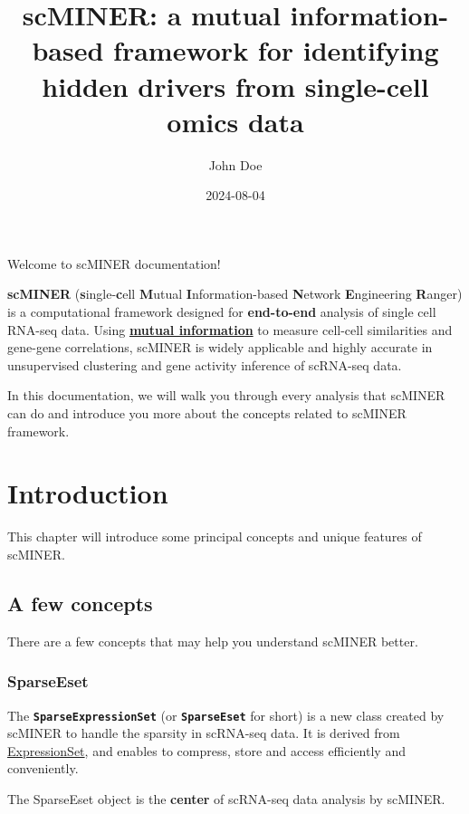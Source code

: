 \documentclass[
  12pt,
]{book}
\title{scMINER: a mutual information-based framework for identifying hidden drivers from single-cell omics data}
\author{John Doe}
\date{2024-08-04}
\begin{document}
\maketitle

{
\hypersetup{linkcolor=}
\setcounter{tocdepth}{1}
\tableofcontents
}
\listoffigures
\listoftables
Welcome to scMINER documentation!

\textbf{scMINER} (\textbf{s}ingle-\textbf{c}ell \textbf{M}utual \textbf{I}nformation-based \textbf{N}etwork \textbf{E}ngineering \textbf{R}anger) is a computational framework designed for \textbf{end-to-end} analysis of single cell RNA-seq data. Using \href{https://en.wikipedia.org/wiki/Mutual_information}{\textbf{mutual information}} to measure cell-cell similarities and gene-gene correlations, scMINER is widely applicable and highly accurate in unsupervised clustering and gene activity inference of scRNA-seq data.

In this documentation, we will walk you through every analysis that scMINER can do and introduce you more about the concepts related to scMINER framework.

\chapter{Introduction}\label{introduction}

This chapter will introduce some principal concepts and unique features of scMINER.

\section{A few concepts}\label{a-few-concepts}

There are a few concepts that may help you understand scMINER better.

\subsection*{SparseEset}\label{sparseeset}

The \textbf{\texttt{SparseExpressionSet}} (or \textbf{\texttt{SparseEset}} for short) is a new class created by scMINER to handle the sparsity in scRNA-seq data. It is derived from \href{https://www.bioconductor.org/packages/release/bioc/vignettes/Biobase/inst/doc/ExpressionSetIntroduction.pdf}{ExpressionSet}, and enables to compress, store and access efficiently and conveniently.

The SparseEset object is the \textbf{center} of scRNA-seq data analysis by scMINER.
\end{document}
